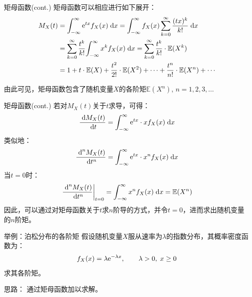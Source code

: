 \documentclass[t]{beamer}
\newcommand{\dif}{{\;\rm d}}
\newcommand{\E}{\mathbb{E}}
\begin{document}
  \begin{frame}{矩母函数(cont.)}
    矩母函数可以相应进行如下展开：
    \begin{equation*}\begin{split}
    M_X(t)&=\int^{\infty}_{-\infty}{\rm e}^{tx}f_X(x)\dif x
    =\int^{\infty}_{-\infty}f_X(x)\sum^{\infty}_{k=0}\frac{(tx)^k}{k!}\dif
    x \\
    &=\sum^{\infty}_{k=0}
    \frac{t^k}{k!}{\int^{\infty}_{-\infty}x^kf_X(x)\dif
    x}=\sum^{\infty}_{k=0} \frac{t^k}{k!}\cdot{\E(X^k)}\\
    &=1+t\cdot
    {\E(X)}+\frac{t^2}{2!}\cdot{\E(X^2)}+\cdots+\frac{t^n}{n!}\cdot{\E(X^n)}+\cdots
    \end{split}
    \end{equation*}
  
    由此可见，矩母函数包含了随机变量$X$的各阶矩$\E(X^n)$, $n=1,2,3,\ldots$
  \end{frame}
  
  \begin{frame}{矩母函数(cont.)}
    若对$M_X(t)$关于$t$求导，可得：
    \begin{equation*}\frac{\dif M_X(t)}{\dif
    t}=\int^{\infty}_{-\infty}{\rm e}^{tx}\cdot xf_X(x)\dif x
    \end{equation*}
    类似地：
    $$\frac{\dif^{n} M_X(t)}{\dif t^n}=\int^{\infty}_{-\infty}{\rm
    e}^{tx}\cdot x^nf_X(x)\dif x$$
    当$t=0$时：
    \begin{equation*}{\left.\frac{\dif^{n} M_X(t)}{\dif
    t^n}\right|_{t=0}}=\int^{\infty}_{-\infty} x^nf_X(x)\dif
    x=\E(X^n) \end{equation*}
    因此，可以通过对矩母函数关于$t$求$n$阶导的方式，并令$t=0$，进而求出随机变量的$n$阶矩。
  
  \end{frame}



  \begin{frame}{举例：泊松分布的各阶矩}
    假设随机变量$X$服从速率为$\lambda$的指数分布，其概率密度函数为：
    \begin{equation*}f_X(x)=\lambda {\rm e}^{-\lambda x},\qquad
    \lambda>0, \; x\ge0 \end{equation*}
      求其各阶矩。
  
      \begin{block}{思路：}
        通过矩母函数加以求解。
      \end{block}
  \end{frame}
\end{document}
